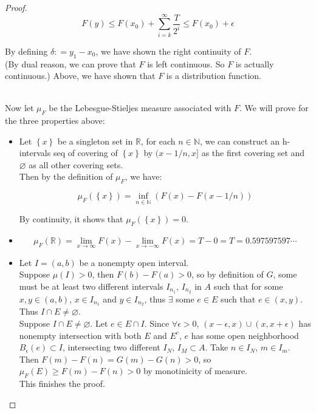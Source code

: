 \documentclass{qlnotes-export}
\begin{document}
\begin{proof}
\[F(y) \leq F(x_{0}) + \sum\limits_{i = k}^{\infty}\frac{T}{2^{i}} \leq F(x_{0}) + \epsilon\]

By defining \(\delta: = y_{1} - x_{0}\), we have shown the right continuity of \(F\).\\
(By dual reason, we can prove that \(F\) is left continuous. So \(F\) is actually continuous.) Above, we have shown that \(F\) is a distribution function.\\
\strut \\
Now let \(\mu_{F}\) be the Lebesgue-Stieljes measure associated with \(F\). We will prove for the three properties above:\\

\begin{itemize}
\item
  Let \(\left\{ x \right\}\) be a singleton set in \(\mathbb{R}\), for each \(n \in {\mathbb{N}}\), we can construct an h-intervals seq of covering of \(\left\{ x \right\}\) by \((x - 1/n,x\rbrack\) as the first covering set and \(\varnothing\) as all other covering sets.\\
  Then by the definition of \(\mu_{F}\), we have:

  \[\mu_{F}(\left\{ x \right\}) = \inf\limits_{n \in {\mathbb{N}}}(F(x) - F(x - 1/n))\]

  By continuity, it shows that \(\mu_{F}(\left\{ x \right\}) = 0\).
\item
  \[\mu_{F}({\mathbb{R}}) = \lim\limits_{x\rightarrow\infty}F(x) - \lim\limits_{x\rightarrow - \infty}F(x) = T - 0 = T = 0.597597597\cdots\]
\item
  Let \(I = (a,b)\) be a nonempty open interval.\\
  Suppose \(\mu(I) > 0\), then \(F(b) - F(a) > 0\), so by definition of \(G\), some must be at least two different intervals \(I_{n_{1}}\), \(I_{n_{2}}\) in \(A\) such that for some \(x,y \in (a,b)\), \(x \in I_{n_{1}}\) and \(y \in I_{n_{2}}\), thus \(\exists\) some \(e \in E\) such that \(e \in (x,y)\). Thus \(I \cap E \neq \varnothing\).\\
  Suppose \(I \cap E \neq \varnothing\). Let \(e \in E \cap I\). Since \(\forall\epsilon > 0\), \((x - \epsilon,x) \cup (x,x + \epsilon)\) has nonempty intersection with both \(E\) and \(E^{c}\), \(e\) has some open neighborhood \(B_{\epsilon}(e) \subset I\), intersecting two different \(I_{N}\), \(I_{M} \subset A\). Take \(n \in I_{N}\), \(m \in I_{m}\). Then \(F(m) - F(n) = G(m) - G(n) > 0\), so \(\mu_{F}(E) \geq F(m) - F(n) > 0\) by monotinicity of measure.\\
  This finishes the proof.
\end{itemize}

\end{proof}
\end{document}
